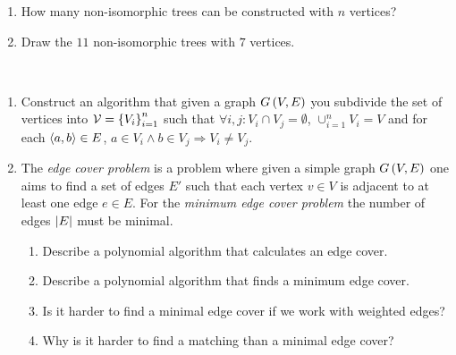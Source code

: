 \documentclass{article}
\begin{document}
\begin{exercise}[Trees]
\begin{enumerate}
 \item How many non-isomorphic trees can be constructed with $n$ vertices?
 \item Draw the $11$ non-isomorphic trees with $7$ vertices.
\end{enumerate}
\end{exercise}
\begin{exercise}~~
\begin{enumerate}
 \item Construct an algorithm that given a graph $G\left( V,E \right)$ you subdivide the set of vertices into $\mathcal{V}=\left\{ V_i \right\}_{i=1}^n$ such that $\forall i,j:V_i\cap V_j=\emptyset$, $\cup_{i=1}^nV_i=V$ and for each $\left\langle a,b \right\rangle\in E$, $a\in V_i\wedge b\in V_j\Rightarrow V_i\neq V_j$.
 \item The \emph{edge cover problem} is a problem where given a simple graph $G\left( V,E \right)$ one aims to find a set of edges $E'$ such that each vertex $v\in V$ is adjacent to at least one edge $e\in E$. For the \emph{minimum edge cover problem} the number of edges $\left|E\right|$ must be minimal.
 \begin{enumerate}
  \item Describe a polynomial algorithm that calculates an edge cover.
  \item Describe a polynomial algorithm that finds a minimum edge cover.
  \item Is it harder to find a minimal edge cover if we work with weighted edges?
  \item Why is it harder to find a matching than a minimal edge cover?
 \end{enumerate}
\end{enumerate}
\end{exercise}
\end{document}
